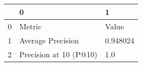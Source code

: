 \begin{tabular}{lll}
\toprule
{} &                       0 &         1 \\
\midrule
0 &                  Metric &     Value \\
1 &       Average Precision &  0.948024 \\
2 &  Precision at 10 (P@10) &       1.0 \\
\bottomrule
\end{tabular}
